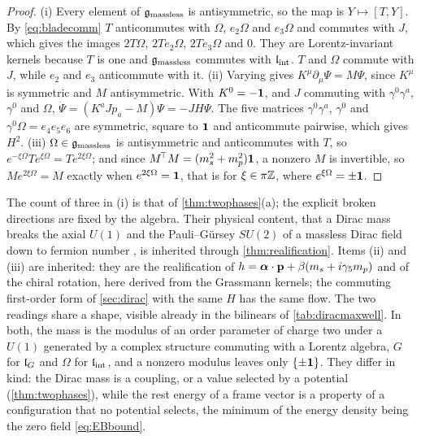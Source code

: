 \begin{proof}
(i) Every element of $\mathfrak g_{\rm massless}$ is antisymmetric, so the map is $Y\mapsto[T,Y]$. By \eqref{eq:bladecomm} $T$ anticommutes
with $\Omega$, $e_2\Omega$ and $e_3\Omega$ and commutes with $J$, which gives the images $2T\Omega$, $2Te_2\Omega$, $2Te_3\Omega$ and $0$. They are
Lorentz-invariant kernels because $T$ is one and $\mathfrak g_{\rm massless}$ commutes with $\mathfrak l_{\rm int}$. $T$ and $\Omega$ commute with $J$, while
$e_2$ and $e_3$ anticommute with it. (ii) Varying gives $K^\mu\partial_\mu\Psi=M\Psi$, since $K^\mu$ is symmetric and $M$ antisymmetric. With
$K^0=-\mathbf 1$, and $J$ commuting with $\gamma^0\gamma^a$, $\gamma^0$ and $\Omega$, $\dot\Psi=(K^aJp_a-M)\Psi=-JH\Psi$. The five matrices
$\gamma^0\gamma^a$, $\gamma^0$ and $\gamma^0\Omega=e_4e_5e_6$ are symmetric, square to $\mathbf 1$ and anticommute pairwise, which gives $H^2$.
(iii) $\Omega\in\mathfrak g_{\rm massless}$ is antisymmetric and anticommutes with $T$, so $e^{-\xi\Omega}Te^{\xi\Omega}=Te^{2\xi\Omega}$; and
since $M^{\!\top}M=(m_s^2+m_p^2)\mathbf 1$, a nonzero $M$ is invertible, so $Me^{2\xi\Omega}=M$ exactly when $e^{2\xi\Omega}=\mathbf 1$, that is for $\xi\in\pi\mathbb{Z}$, where $e^{\xi\Omega}=\pm\mathbf 1$.
\end{proof}

The count of three in (i) is that of \cref{thm:twophases}(a); the explicit broken directions are fixed by the algebra. Their physical
content, that a Dirac mass breaks the axial $U(1)$ and the Pauli--G\"ursey $SU(2)$ of a massless Dirac field down to fermion number
\cite{Pauli57,Gursey58}, is inherited through \cref{thm:realification}. Items (ii) and (iii) are inherited: they are the realification of
$h=\boldsymbol\alpha\cdot\mathbf p+\beta(m_s+i\gamma_5m_p)$ and of the chiral rotation, here derived from the Grassmann kernels; the commuting
first-order form of \cref{sec:dirac} with the same $H$ has the same flow. The two readings share a shape, visible already in the bilinears of \cref{tab:diracmaxwell}. In both, the mass is the
modulus of an order parameter of charge two under a $U(1)$ generated by a complex structure commuting with a Lorentz algebra, $G$ for
$\mathfrak l_G$ and $\Omega$ for $\mathfrak l_{\rm int}$, and a nonzero modulus leaves only $\{\pm\mathbf 1\}$. They differ in kind: the Dirac mass is a coupling, or a value
selected by a potential (\cref{thm:twophases}), while the rest energy of a frame vector is a property of a configuration that no
potential selects, the minimum of the energy density being the zero field \eqref{eq:EBbound}.

